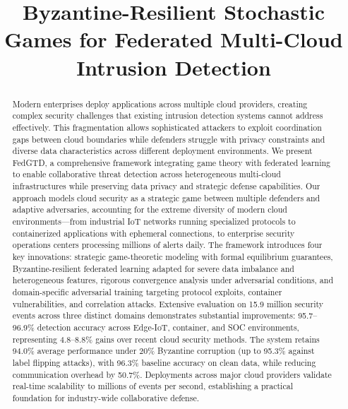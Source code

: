 \documentclass[12pt,a4paper]{article}
\theoremstyle{definition}
\begin{document}
\title{\textbf{Byzantine-Resilient Stochastic Games for Federated Multi-Cloud Intrusion Detection}}
\vspace{-2.5cm}
\date{}
\maketitle

\begin{abstract}
\noindent Modern enterprises deploy applications across multiple cloud providers, creating complex security challenges that existing intrusion detection systems cannot address effectively. This fragmentation allows sophisticated attackers to exploit coordination gaps between cloud boundaries while defenders struggle with privacy constraints and diverse data characteristics across different deployment environments. We present FedGTD, a comprehensive framework integrating game theory with federated learning to enable collaborative threat detection across heterogeneous multi-cloud infrastructures while preserving data privacy and strategic defense capabilities. Our approach models cloud security as a strategic game between multiple defenders and adaptive adversaries, accounting for the extreme diversity of modern cloud environments—from industrial IoT networks running specialized protocols to containerized applications with ephemeral connections, to enterprise security operations centers processing millions of alerts daily. The framework introduces four key innovations: strategic game-theoretic modeling with formal equilibrium guarantees, Byzantine-resilient federated learning adapted for severe data imbalance and heterogeneous features, rigorous convergence analysis under adversarial conditions, and domain-specific adversarial training targeting protocol exploits, container vulnerabilities, and correlation attacks. Extensive evaluation on 15.9 million security events across three distinct domains demonstrates substantial improvements: 95.7--96.9\% detection accuracy across Edge-IoT, container, and SOC environments, representing 4.8--8.8\% gains over recent cloud security methods. The system retains 94.0\% average performance under 20\% Byzantine corruption (up to 95.3\% against label flipping attacks), with 96.3\% baseline accuracy on clean data, while reducing communication overhead by 50.7\%. Deployments across major cloud providers validate real-time scalability to millions of events per second, establishing a practical foundation for industry-wide collaborative defense.
\end{abstract}
\end{document}
